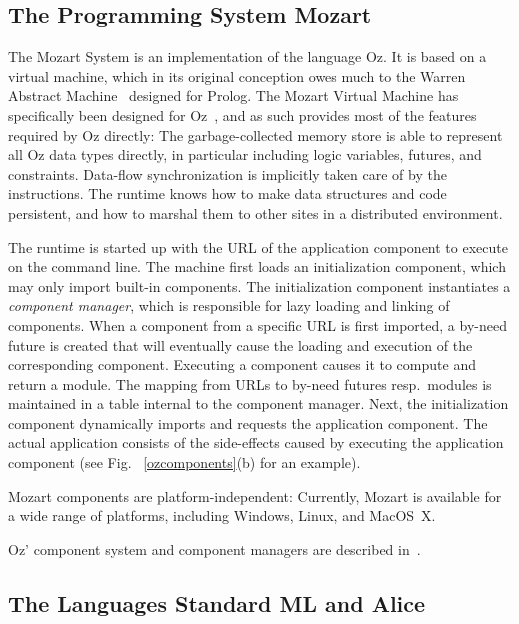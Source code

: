 \documentclass{entcs}
\begin{document}
\subsection{The Programming System Mozart}

The Mozart System is an implementation of the language Oz.  It is based on
a virtual machine, which in its original conception owes much to the Warren
Abstract Machine~\cite{WAM} designed for Prolog.  The Mozart Virtual Machine
has specifically been designed for Oz~\cite{Amoz,Mehl}, and as such provides
most of the features required by Oz directly:  The garbage-collected memory
store is able to represent all Oz data types directly, in particular including
logic variables, futures, and constraints.  Data-flow synchronization is
implicitly taken care of by the instructions.  The runtime knows how to make
data structures and code persistent, and how to marshal them to other sites
in a distributed environment.

The runtime is started up with the URL of the application component to execute
on the command line.  The machine first loads an initialization component,
which may only import built-in components.  The initialization component
instantiates a \emph{component manager}, which is responsible for lazy
loading and linking of components.  When a component from a specific URL is
first imported, a by-need future is created that will eventually cause the
loading and execution of the corresponding component.  Executing a component
causes it to compute and return a module.  The mapping from URLs to by-need
futures resp.\ modules is maintained in a table internal to the component
manager.  Next, the initialization component dynamically imports and requests
the application component.  The actual application consists of the
side-effects caused by executing the application component (see Fig.~%
\ref{ozcomponents}(b) for an example).

Mozart components are platform-independent:  Currently, Mozart is available
for a wide range of platforms, including Windows, Linux, and MacOS~X.

Oz' component system and component managers are described in~\cite{OzModules}.

\subsection{The Languages Standard ML and Alice}
\end{document}
